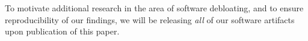 To motivate additional research in the area of software debloating, and to ensure reproducibility of our findings, we will be releasing \emph{all} of our software artifacts upon publication of this paper.


